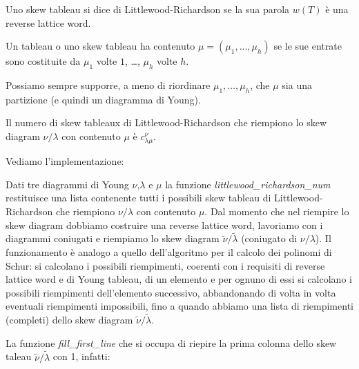 \begin{defn}
Uno skew tableau si dice di Littlewood-Richardson se la sua parola
$w(T)$ \`e una reverse lattice word.
\end{defn}

\begin{defn}
Un tableau o uno skew tableau ha contenuto $\mu = (\mu_1, \ldots,
\mu_h)$ se le sue entrate sono costituite da $\mu_1$ volte $1$,
\ldots, $\mu_h$ volte $h$.
\end{defn}

\begin{oss}
Possiamo sempre supporre, a meno di riordinare $\mu_1, \ldots,\mu_h$,
che $\mu$ sia una partizione (e quindi un diagramma di Young).
\end{oss}

\begin{prop}
Il numero di skew tableaux di Littlewood-Richardson che riempiono lo
skew diagram $\nu/\lambda$ con contenuto $\mu$ \`e $c_{\lambda \mu}^{\nu}$.
\end{prop}

Vediamo l'implementazione:


Dati tre diagrammi di Young $\nu$,$\lambda$ e $\mu$ la funzione
\emph{littlewood\_richardson\_num} restituisce una lista contenente
tutti i possibili skew tableau di Littlewood-Richardson che riempiono
$\nu/\lambda$ con contenuto $\mu$. Dal momento che nel riempire lo
skew diagram dobbiamo costruire una reverse lattice word, lavoriamo
con i diagrammi coniugati e riempiamo lo skew diagram
$\tilde{\nu}/\tilde{\lambda}$ (coniugato di $\nu/\lambda$).
Il funzionamento \`e analogo a quello dell'algoritmo per il calcolo
dei polinomi di Schur: si calcolano i possibili riempimenti, coerenti
con i requisiti di reverse lattice word e di Young tableau, di un
elemento e per ognuno di essi si calcolano i possibili riempimenti
dell'elemento successivo, abbandonando di volta in volta eventuali
riempimenti impossibili, fino a quando abbiamo una lista di
riempimenti (completi) dello skew diagram $\tilde{\nu}/\tilde{\lambda}$.

La funzione \emph{fill\_first\_line} che si occupa di riepire la prima
colonna dello skew taleau $\tilde{\nu}/\tilde{\lambda}$ con 1, infatti:

